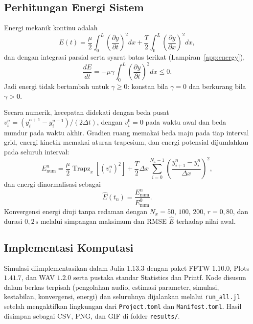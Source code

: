\documentclass[aps,prl,twocolumn,superscriptaddress]{revtex4-2}
\begin{document}
    \subsection{Perhitungan Energi Sistem}

        Energi mekanik kontinu adalah
        \begin{equation}
            E(t)= \frac{\mu}{2} \int_0^L \left(\frac{\partial y}{\partial t}\right)^2 dx + \frac{T}{2} \int_0^L \left(\frac{\partial y}{\partial x}\right)^2 dx,
            \label{eq:continuous-energy}
        \end{equation}
        dan dengan integrasi parsial serta syarat batas terikat (Lampiran~\ref{app:energy}),
        \begin{equation}
            \frac{dE}{dt} = -\mu\gamma \int_0^L \left(\frac{\partial y}{\partial t}\right)^2 dx \leq 0.
            \label{eq:energy-dissipation}
        \end{equation}
        Jadi energi tidak bertambah untuk $\gamma\geq0$: konstan bila $\gamma=0$ dan berkurang bila $\gamma>0$.

        Secara numerik, kecepatan didekati dengan beda pusat $v_i^n=(y_i^{n+1}-y_i^{n-1})/(2\Delta t)$, dengan $v_i^0=0$ pada waktu awal dan beda mundur pada waktu akhir. 
        Gradien ruang memakai beda maju pada tiap interval grid, energi kinetik memakai aturan trapesium, dan energi potensial dijumlahkan pada seluruh interval:
        \begin{equation}
            E_{\mathrm{num}}^n = \frac{\mu}{2} \operatorname{Trapz}_x\left[(v_i^n)^2\right] + \frac{T}{2}\Delta x \sum_{i=0}^{N_x-1} \left( \frac{y_{i+1}^n-y_i^n}{\Delta x} \right)^2,
            \label{eq:discrete-energy}
        \end{equation}
        dan energi dinormalisasi sebagai
        \begin{equation}
            \widehat{E}(t_n) = \frac{E_{\mathrm{num}}^n}{E_{\mathrm{num}}^0}.
            \label{eq:normalized-energy}
        \end{equation}
        Konvergensi energi diuji tanpa redaman dengan $N_x=50$, $100$, $200$, $r=0{,}80$, dan durasi $0{,}2\,\mathrm{s}$ melalui simpangan maksimum dan RMSE $\widehat{E}$ terhadap nilai awal.

    \subsection{Implementasi Komputasi}

        Simulasi diimplementasikan dalam Julia $1.13.3$ dengan paket FFTW $1.10.0$, Plots $1.41.7$, dan WAV $1.2.0$ serta pustaka standar Statistics dan Printf. 
        Kode disusun dalam berkas terpisah (pengolahan audio, estimasi parameter, simulasi, kestabilan, konvergensi, energi) dan seluruhnya dijalankan melalui \texttt{run\_all.jl} setelah mengaktifkan lingkungan dari \texttt{Project.toml} dan \texttt{Manifest.toml}. 
        Hasil disimpan sebagai CSV, PNG, dan GIF di folder \texttt{results/}.
\end{document}
